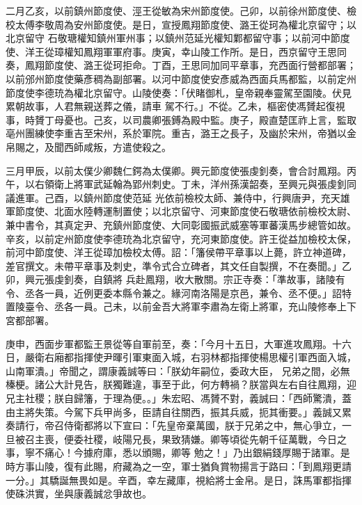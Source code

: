 \begin{pinyinscope}
 二月乙亥，以前鎮州節度使、涇王從敏為宋州節度使。己卯，以前徐州節度使、檢校太傅李敬周為安州節度使。是日，宣授鳳翔節度使、潞王從珂為權北京留守；以北京留守
 石敬瑭權知鎮州軍州事；以鎮州范延光權知鄴都留守事；以前河中節度使、洋王從璋權知鳳翔軍軍府事。庚寅，幸山陵工作所。是日，西京留守王思同奏，鳳翔節度使、潞王從珂拒命。丁酉，王思同加同平章事，充西面行營都部署；以前邠州節度使藥彥稠為副部署。以河中節度使安彥威為西面兵馬都監，以前定州節度使李德珫為權北京留守。山陵使奏：「伏睹御札，皇帝親奉靈駕至園陵。伏見累朝故事，人君無親送葬之儀，請車
 駕不行。」不從。乙未，樞密使馮贇起復視事，時贇丁母憂也。己亥，以司農卿張鎛為殿中監。庚子，殿直楚匡祚上言，監取亳州團練使李重吉至宋州，系於軍院。重吉，潞王之長子，及幽於宋州，帝猶以金帛賜之，及聞西師咸叛，方遣使殺之。



 三月甲辰，以前太僕少卿魏仁鍔為太僕卿。興元節度使張虔釗奏，會合討鳳翔。丙午，以右領衛上將軍武延翰為郢州刺史。丁未，洋州孫漢韶奏，至興元與張虔釗同議進軍。己酉，以鎮州節度使范延
 光依前檢校太師、兼侍中，行興唐尹，充天雄軍節度使、北面水陸轉運制置使；以北京留守、河東節度使石敬瑭依前檢校太尉、兼中書令，其真定尹、充鎮州節度使、大同彰國振武威塞等軍蕃漢馬步總管如故。辛亥，以前定州節度使李德珫為北京留守，充河東節度使。許王從益加檢校太保，前河中節度使、洋王從璋加檢校太傅。詔：「籓侯帶平章事以上薨，許立神道碑，差官撰文。未帶平章事及刺史，準令式合立碑者，其文任自製撰，不在奏聞。」乙卯，興元張虔釗奏，自鎮將
 兵赴鳳翔，收大散關。宗正寺奏：「準故事，諸陵有令、丞各一員，近例更委本縣令兼之。緣河南洛陽是京邑，兼令、丞不便。」詔特置陵臺令、丞各一員。己未，以前金吾大將軍李肅為左衛上將軍，充山陵修奉上下宮都部署。



 庚申，西面步軍都監王景從等自軍前至，奏：「今月十五日，大軍進攻鳳翔。十六日，嚴衛右廂都指揮使尹暉引軍東面入城，右羽林都指揮使楊思權引軍西面入城，山南軍潰。」帝聞之，謂康義誠等曰：「朕幼年嗣位，委政大臣，
 兄弟之間，必無榛梗。諸公大計見告，朕獨難違，事至于此，何方轉禍？朕當與左右自往鳳翔，迎兄主社稷；朕自歸籓，于理為便。。」朱宏昭、馮贇不對，義誠曰：「西師驚潰，蓋由主將失策。今駕下兵甲尚多，臣請自往關西，振其兵威，扼其衝要。」義誠又累奏請行，帝召侍衛都將以下宣曰：「先皇帝棄萬國，朕于兄弟之中，無心爭立，一旦被召主喪，便委社稷，岐陽兄長，果致猜嫌。卿等頃從先朝千征萬戰，今日之事，寧不痛心！今據府庫，悉以頒賜，卿等
 勉之！」乃出銀絹錢厚賜于諸軍。是時方事山陵，復有此賜，府藏為之一空，軍士猶負賞物揚言于路曰：「到鳳翔更請一分。」其驕誕無畏如是。辛酉，幸左藏庫，視給將士金帛。是日，誅馬軍都指揮使硃洪實，坐與康義誠忿爭故也。




\end{pinyinscope}
